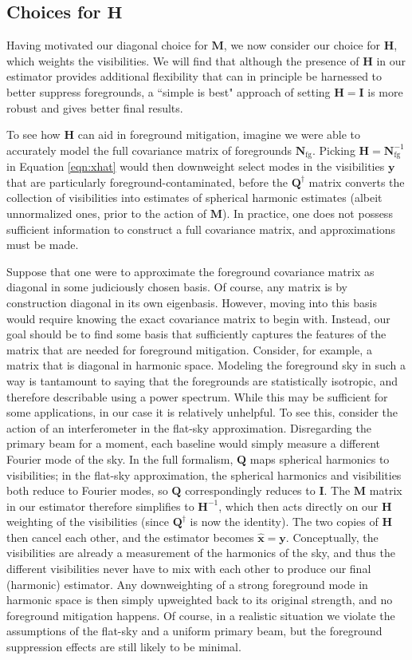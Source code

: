 \documentclass[twolcolumn,apj,iop,numberedappendix]{emulateapj}
\newcommand{\xhat}{\hat{\mathbf{x}}}
\newcommand{\y}{\mathbf{y}}
\newcommand{\Hmat}{\mathbf{H}}
\newcommand{\Nfg}{\mathbf{N}_{\textrm{fg}}}
\newcommand{\Q}{\mathbf{Q}}
\newcommand{\M}{\mathbf{M}}
\begin{document}
\subsection{Choices for $\Hmat$}

Having motivated our diagonal choice for $\M$, we now consider our choice for $\Hmat$, which weights the visibilities. We will find that although the presence of $\Hmat$ in our estimator provides additional flexibility that can in principle be harnessed to better suppress foregrounds, a ``simple is best" approach of setting $\Hmat = \mathbf{I}$ is more robust and gives better final results.

To see how $\Hmat$ can aid in foreground mitigation, imagine we were able to accurately model the full covariance matrix of foregrounds $\mathbf{N}_\textrm{fg}$. Picking $\Hmat = \Nfg^{-1}$ in Equation \eqref{eqn:xhat} would then downweight select modes in the visibilities $\y$ that are particularly foreground-contaminated, before the $\Q^\dagger$ matrix converts the collection of visibilities into estimates of spherical harmonic estimates (albeit unnormalized ones, prior to the action of $\M$). In practice, one does not possess sufficient information to construct a full covariance matrix, and approximations must be made.

Suppose that one were to approximate the foreground covariance matrix as diagonal in some judiciously chosen basis. Of course, any matrix is by construction diagonal in its own eigenbasis. However, moving into this basis would require knowing the exact covariance matrix to begin with. Instead, our goal should be to find some basis that sufficiently captures the features of the matrix that are needed for foreground mitigation. Consider, for example, a matrix that is diagonal in harmonic space. Modeling the foreground sky in such a way is tantamount to saying that the foregrounds are statistically isotropic, and therefore describable using a power spectrum. While this may be sufficient for some applications, in our case it is relatively unhelpful. To see this, consider the action of an interferometer in the flat-sky approximation.  Disregarding the primary beam for a moment, each baseline would simply measure a different Fourier mode of the sky. In the full formalism, $\Q$ maps spherical harmonics to visibilities; in the flat-sky approximation, the spherical harmonics and visibilities both reduce to Fourier modes, so $\Q$ correspondingly reduces to $\mathbf{I}$. The $\M$ matrix in our estimator therefore simplifies to $\Hmat^{-1}$, which then acts directly on our $\Hmat$ weighting of the visibilities (since $\Q^\dagger$ is now the identity). The two copies of $\Hmat$ then cancel each other, and the estimator becomes $\xhat = \y$. Conceptually, the visibilities are already a measurement of the harmonics of the sky, and thus the different visibilities never have to mix with each other to produce our final (harmonic) estimator. Any downweighting of a strong foreground mode in harmonic space is then simply upweighted back to its original strength, and no foreground mitigation happens. Of course, in a realistic situation we violate the assumptions of the flat-sky and a uniform primary beam, but the foreground suppression effects are still likely to be minimal.
\end{document}
